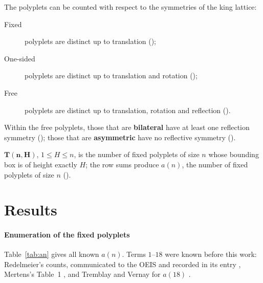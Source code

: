 \documentclass[11pt]{article}
\begin{document}
The polyplets can be counted with respect to the symmetries of the king
lattice:
\begin{description}
\item[Fixed] polyplets are distinct up to translation ();
\item[One-sided] polyplets are distinct up to translation and rotation
  ();
\item[Free] polyplets are distinct up to translation, rotation and reflection
  ().
\end{description}

Within the free polyplets, those that are \textbf{bilateral} have at least one
reflection symmetry (); those that are \textbf{asymmetric} have
no reflective symmetry ().

$\mathbf{T(n,H)}$, $1 \le H \le n$, is the number of fixed polyplets of size
$n$ whose bounding box is of height exactly $H$; the row sums produce $a(n)$,
the number of fixed polyplets of size $n$ ().

\section{Results}
\label{sec:results}

\paragraph{Enumeration of the fixed polyplets} Table~\ref{tab:an} gives all
known $a(n)$. Terms $1$--$18$ were known before this work: Redelmeier's
counts, communicated to the OEIS and recorded in its entry
\cite{oeisA006770}, Mertens's Table~1 \cite{mertens1990}, and Tremblay and
Vernay for $a(18)$ \cite{tremblayVernay2024}.
\end{document}
